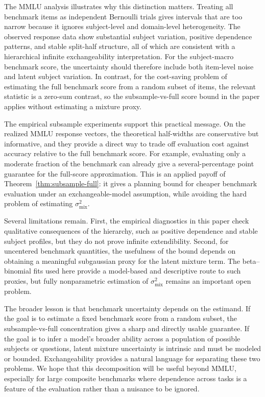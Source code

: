 \documentclass[11pt]{article}
\theoremstyle{definition}
\theoremstyle{remark}
\begin{document}
The MMLU analysis illustrates why this distinction matters.  Treating all
benchmark items as independent Bernoulli trials gives intervals that are too
narrow because it ignores subject-level and domain-level heterogeneity.  The
observed response data show substantial subject variation, positive dependence
patterns, and stable split-half structure, all of which are consistent with a
hierarchical infinite exchangeability interpretation.  For the subject-macro benchmark
score, the uncertainty should therefore include both item-level noise and
latent subject variation. In contrast, for the cost-saving problem of estimating the full benchmark score from a random subset of items, the relevant statistic is a zero-sum contrast, so the subsample-vs-full score bound in the paper applies without estimating a mixture proxy.

The empirical subsample experiments support this practical message. On the realized MMLU response vectors, the theoretical half-widths are conservative but informative, and they provide a direct way to trade off evaluation cost against accuracy relative to the full benchmark score. For example, evaluating only a moderate fraction of the benchmark can already give a several-percentage point guarantee for the full-score approximation. This is an applied payoff of Theorem~\ref{thm:subsample-full}: it gives a planning bound for cheaper benchmark evaluation under an exchangeable-model assumption, while avoiding the hard problem of estimating \(\sigma_{\mathrm{mix}}^2\).

Several limitations remain. First, the empirical diagnostics in this paper check qualitative consequences of the hierarchy, such as positive dependence and stable subject profiles, but they do not prove infinite extendibility. Second, for uncentered benchmark quantities, the usefulness of the bound depends on obtaining a meaningful subgaussian proxy for the latent mixture term. The beta--binomial fits used here provide a model-based and descriptive route to such proxies, but fully nonparametric estimation of \(\sigma_{\mathrm{mix}}^2\) remains an important open problem.

The broader lesson is that benchmark uncertainty depends on the estimand. If the goal is to estimate a fixed benchmark score from a random
subset, the subsample-vs-full concentration gives a sharp and directly usable guarantee. If the goal is to infer a model's broader ability across a population of possible subjects or questions, latent mixture uncertainty is intrinsic and must be modeled or bounded. Exchangeability provides a natural language for separating these two problems. We hope that this decomposition will be useful beyond MMLU, especially for large composite benchmarks where dependence across tasks is a feature of the evaluation rather than a nuisance to be ignored.




\end{document}
